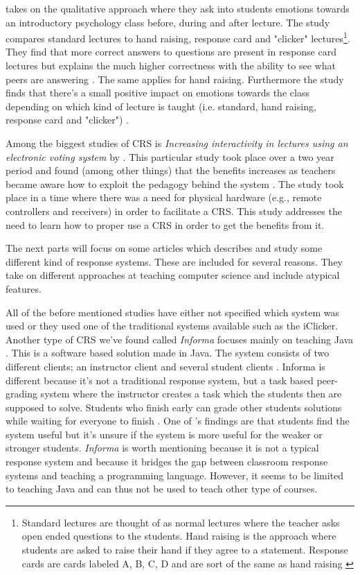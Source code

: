  takes on the qualitative approach where they ask into students emotions towards an introductory psychology class before, during and after lecture. The study compares standard lectures to hand raising, response card and "clicker" lectures\footnote{Standard lectures are thought of as normal lectures where the teacher asks open ended questions to the students. Hand raising is the approach where students are asked to raise their hand if they agree to a statement. Response cards are cards labeled A, B, C, D and are sort of the same as hand raising \cite[p.~254]{stowell2007benefits}}.
They find that more correct answers to questions are present in response card lectures but explains the much higher correctness with the ability to see what peers are answering \cite[p.~257]{stowell2007benefits}. The same applies for hand raising. Furthermore the study finds that there's a small positive impact on emotions towards the class depending on which kind of lecture is taught (i.e. standard, hand raising, response card and "clicker") \cite{stowell2007benefits}.


Among the biggest studies of CRS is \emph{Increasing interactivity in lectures using an electronic voting system} by . This particular study took place over a two year period and found (among other things) that the benefits increases as teachers became aware how to exploit the pedagogy behind the system \cite[p.~93]{draper2004increasing}. The study took place in a time where there was a need for physical hardware (e.g., remote controllers and receivers) in order to facilitate a CRS. This study addresses the need to learn how to proper use a CRS in order to get the benefits from it.

The next parts will focus on some articles which describes and study some different kind of response systems. These are included for several reasons. They take on different approaches at teaching computer science and include atypical features.

All of the before mentioned studies have either not specified which system was used or they used one of the traditional systems available such as the iClicker. Another type of CRS we've found called \emph{Informa} focuses mainly on teaching Java \cite{Hauswirth09}. This is a software based solution made in Java. The system consists of two different clients; an instructor client and several student clients \cite[p.~1]{Hauswirth09}. Informa is different because it's not a traditional response system, but a task based peer-grading system where the instructor creates a task which the students then are supposed to solve. Students who finish early can grade other students solutions while waiting for everyone to finish \cite{Hauswirth09}. One of 's findings are that students find the system useful but it's unsure if the system is more useful for the weaker or stronger students. \emph{Informa} is worth mentioning because it is not a typical response system and because it bridges the gap between classroom response systems and teaching a programming language. However, it seems to be limited to teaching Java and can thus not be used to teach other type of courses.

